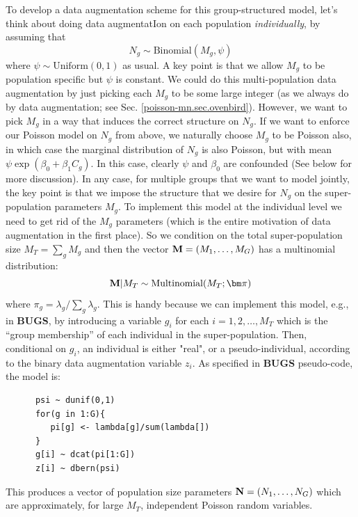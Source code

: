 To develop a data augmentation scheme for this group-structured model,
let's think about doing data augmentatIon on each population {\it
  individually}, by assuming that
\[
 N_{g} \sim \mbox{Binomial}(M_{g} , \psi)
\]
where $\psi \sim \mbox{Uniform}(0,1)$ as usual.  A key point is that
we allow $M_{g}$ to be population specific but $\psi$ is constant.  We
could do this multi-population data augmentation by just picking each
$M_{g}$ to be some large integer (as we always do by data
augmentation; see Sec. \ref{poisson-mn.sec.ovenbird}). However, we
want to pick $M_{g}$ in a way that induces
the correct structure on
$N_{g}$. If we want to enforce our Poisson model on $N_{g}$ from
above, we naturally choose $M_{g}$ to be Poisson also, in which case
the marginal distribution of $N_{g}$ is also Poisson, but with mean
$\psi \exp(\beta_{0} + \beta_{1}C_{g})$.  In this case, clearly $\psi$ and
$\beta_{0}$ are confounded (See below for more discussion).
In any case, for multiple groups that we want to model jointly, the
key point is that we
 impose the structure that we desire for $N_{g}$ on the
super-population parameters $M_{g}$.  To implement this model at the
individual level we need to get rid of the $M_{g}$ parameters (which
is the entire motivation of data augmentation in the first place). So
we condition on the total super-population size $M_{T}= \sum_{g}
M_{g}$ and then the vector ${\bf M} = (M_{1},\ldots,M_{G})$ has a
multinomial distribution:
\begin{equation}
{\bf M}|M_{T} \sim \mbox{Multinomial}(M_{T};  {\bm \pi} )
\label{eq.mn1}
\end{equation}
where
$\pi_{g} = \lambda_{g}/\sum_{g} \lambda_{g}$.  This is handy because
we can implement this model, e.g., in {\bf BUGS}, by introducing a
variable $g_{i}$ for each $i=1,2,\ldots, M_{T}$ which is the ``group
membership'' of each individual in the super-population.  Then,
conditional on $g_{i}$, an individual is either "real", or a
pseudo-individual, according to the binary data augmentation variable
$z_{i}$.  As specified in {\bf BUGS} pseudo-code, the
model is:
\begin{verbatim}
      psi ~ dunif(0,1)
      for(g in 1:G){
         pi[g] <- lambda[g]/sum(lambda[])
      }
      g[i] ~ dcat(pi[1:G])
      z[i] ~ dbern(psi)
\end{verbatim}
This produces a vector of population size parameters ${\bf N} =
(N_{1},\ldots,N_{G})$ which are approximately, for large $M_{T}$,
independent Poisson random variables.

